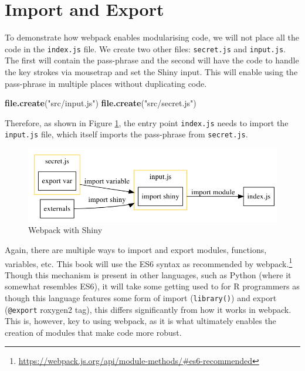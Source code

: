 \documentclass[10pt,]{krantz}
\makeatletter
\newenvironment{Shaded}{\begin{snugshade}}{\end{snugshade}}
\newcommand{\KeywordTok}[1]{\textcolor[rgb]{0.27,0.27,0.27}{\textbf{#1}}}
\newcommand{\NormalTok}[1]{#1}
\newcommand{\StringTok}[1]{\textcolor[rgb]{0.5,0.5,0.5}{#1}}
\renewcommand{\href}[2]{#2\footnote{\url{#1}}}
\newenvironment{kframe}{%
\medskip{}
\setlength{\fboxsep}{.8em}
 \def\at@end@of@kframe{}%
 \ifinner\ifhmode%
  \def\at@end@of@kframe{\end{minipage}}%
  \begin{minipage}{\columnwidth}%
 \fi\fi%
 \def\FrameCommand##1{\hskip\@totalleftmargin \hskip-\fboxsep
 \colorbox{shadecolor}{##1}\hskip-\fboxsep
     \hskip-\linewidth \hskip-\@totalleftmargin \hskip\columnwidth}%
 \MakeFramed {\advance\hsize-\width
   \@totalleftmargin\z@ \linewidth\hsize
   \@setminipage}}%
 {\par\unskip\endMakeFramed%
 \at@end@of@kframe}
\renewenvironment{Shaded}{\begin{kframe}}{\end{kframe}}
\makeatother
\begin{document}
\hypertarget{webpack-intro-import-export}{%
\section{Import and Export}\label{webpack-intro-import-export}}

To demonstrate how webpack enables modularising code, we will not place all the code in the \texttt{index.js} file. We create two other files: \texttt{secret.js} and \texttt{input.js}. The first will contain the pass-phrase and the second will have the code to handle the key strokes via mousetrap and set the Shiny input. This will enable using the pass-phrase in multiple places without duplicating code.

\begin{Shaded}
\begin{Highlighting}[]
\KeywordTok{file.create}\NormalTok{(}\StringTok{"src/input.js"}\NormalTok{)}
\KeywordTok{file.create}\NormalTok{(}\StringTok{"src/secret.js"}\NormalTok{)}
\end{Highlighting}
\end{Shaded}

Therefore, as shown in Figure \ref{fig:webpack-shiny}, the entry point \texttt{index.js} needs to import the \texttt{input.js} file, which itself imports the pass-phrase from \texttt{secret.js}.

\begin{figure}[H]

{\centering \includegraphics[width=1\linewidth]{images/07-webpack-shiny} 

}

\caption{Webpack with Shiny}\label{fig:webpack-shiny}
\end{figure}

Again, there are multiple ways to import and export modules, functions, variables, etc. This book will use the ES6 syntax as \href{https://webpack.js.org/api/module-methods/\#es6-recommended}{recommended by webpack.} Though this mechanism is present in other languages, such as Python (where it somewhat resembles ES6), it will take some getting used to for R programmers as though this language features some form of import (\texttt{library()}) and export (\texttt{@export} roxygen2 tag), this differs significantly from how it works in webpack. This is, however, key to using webpack, as it is what ultimately enables the creation of modules that make code more robust.
\end{document}
